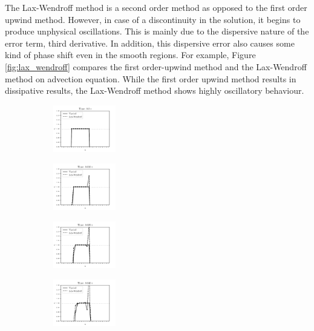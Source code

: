 \documentclass[journal,onecolumn]{IEEEtran}
\begin{document}
The Lax-Wendroff method is a second order method as opposed to the first order upwind method. However, in case of a discontinuity in the solution, it begins to produce unphysical oscillations. This is mainly due to the dispersive nature of the error term, third derivative. In addition, this dispersive error also causes some kind of phase shift even in the smooth regions. For example, Figure \ref{fig:lax_wendroff} compares the first order-upwind method and the Lax-Wendroff method on advection equation. While the first order upwind method results in dissipative results, the Lax-Wendroff method shows highly oscillatory behaviour.

\begin{figure}
    \centering
    \begin{subfigure}{\textwidth}
    \centering
    \includegraphics[width=0.3\textwidth]{figures/lax-initial.pdf}
    \end{subfigure}
    \begin{subfigure}{\textwidth}
    \centering
    \includegraphics[width=0.3\textwidth]{figures/lax0.010.pdf}
    \end{subfigure}
    \begin{subfigure}{\textwidth}
    \centering
    \includegraphics[width=0.3\textwidth]{figures/lax0.020.pdf}
    \end{subfigure}
    \begin{subfigure}{\textwidth}
    \centering
    \includegraphics[width=0.3\textwidth]{figures/lax0.040.pdf}

\end{subfigure}
\end{figure}
\end{document}
